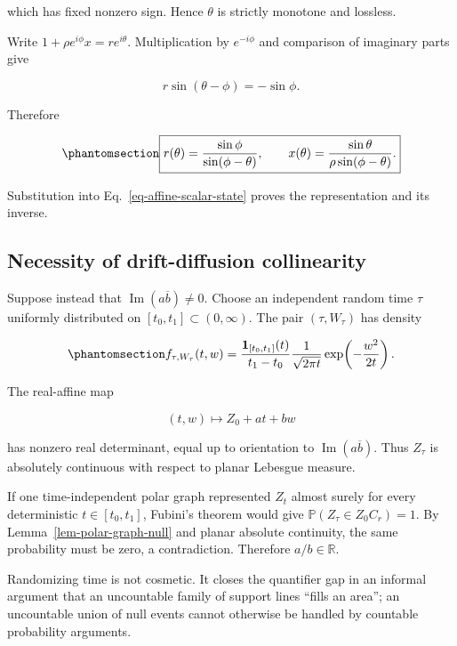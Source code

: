 \documentclass[
  english,
  10pt,
  letterpaper,
  DIV=11,
  numbers=noendperiod]{scrartcl}
\theoremstyle{definition}
\theoremstyle{plain}
\theoremstyle{plain}
\theoremstyle{remark}
\begin{document}
which has fixed nonzero sign. Hence \(\theta\) is strictly monotone and
lossless.

Write \(1+\rho e^{i\phi}x=re^{i\theta}\). Multiplication by
\(e^{-i\phi}\) and comparison of imaginary parts give

\[
r\sin(\theta-\phi)=-\sin\phi.
\]

Therefore

\begin{equation}\protect\phantomsection\label{eq-general-radius-inverse}{
\boxed{
r(\theta)=\frac{\sin\phi}{\sin(\phi-\theta)},
\qquad
x(\theta)
=\frac{\sin\theta}{\rho\sin(\phi-\theta)}.
}
}\end{equation}

Substitution into Eq.~\ref{eq-affine-scalar-state} proves the
representation and its inverse.

\subsection{Necessity of drift-diffusion
collinearity}\label{necessity-of-drift-diffusion-collinearity}

Suppose instead that \(\operatorname{Im}(a\overline b)\ne0\). Choose an
independent random time \(\tau\) uniformly distributed on
\([t_0,t_1]\subset(0,\infty)\). The pair \((\tau,W_\tau)\) has density

\begin{equation}\protect\phantomsection\label{eq-random-time-density}{
f_{\tau,W_\tau}(t,w)
=
\frac{\mathbf 1_{[t_0,t_1]}(t)}{t_1-t_0}
\frac{1}{\sqrt{2\pi t}}
\exp\!\left(-\frac{w^2}{2t}\right).
}\end{equation}

The real-affine map

\[
(t,w)\longmapsto Z_0+at+bw
\]

has nonzero real determinant, equal up to orientation to
\(\operatorname{Im}(a\overline b)\). Thus \(Z_\tau\) is absolutely
continuous with respect to planar Lebesgue measure.

If one time-independent polar graph represented \(Z_t\) almost surely
for every deterministic \(t\in[t_0,t_1]\), Fubini's theorem would give
\(\mathbb P(Z_\tau\in Z_0C_r)=1\). By Lemma~\ref{lem-polar-graph-null}
and planar absolute continuity, the same probability must be zero, a
contradiction. Therefore \(a/b\in\mathbb R\).

Randomizing time is not cosmetic. It closes the quantifier gap in an
informal argument that an uncountable family of support lines ``fills an
area''; an uncountable union of null events cannot otherwise be handled
by countable probability arguments.
\end{document}
